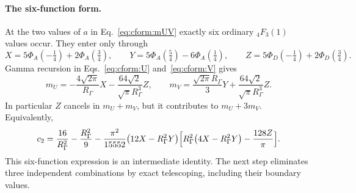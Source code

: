 \documentclass[11pt,a4paper]{article}
\numberwithin{equation}{section}
\begin{document}
\paragraph{The six-function form.} At the two values of $a$ in Eq.~\eqref{eq:cform:mUV} exactly six ordinary
${}_4F_3(1)$ values occur. They enter only through
\begin{equation}
 X=5\Phi_A(-\tfrac14)+2\Phi_A(\tfrac34),\qquad Y=5\Phi_A(\tfrac54)-6\Phi_A(\tfrac14),\qquad
 Z=5\Phi_D(-\tfrac14)+2\Phi_D(\tfrac34).
 \label{eq:cform:XYZ}
\end{equation}
Gamma recursion in Eqs.~\eqref{eq:cform:U} and~\eqref{eq:cform:V} gives
\begin{equation}
 m_U=-\frac{4\sqrt{2\pi}}{R_\Gamma}X-\frac{64\sqrt2}{\sqrt\pi R_\Gamma^3}Z,\qquad
 m_V=\frac{\sqrt{2\pi}R_\Gamma}{3}Y+\frac{64\sqrt2}{\sqrt\pi R_\Gamma^3}Z.
\end{equation}
In particular $Z$ cancels in $m_U+m_V$, but it contributes to $m_U+3m_V$. Equivalently,
\begin{equation}
 c_2=\frac{16}{R_\Gamma^2}-\frac{R_\Gamma^2}{9}-\frac{\pi^2}{15552}\bigl(12X-R_\Gamma^2Y\bigr)
 \Bigl[R_\Gamma^2\bigl(4X-R_\Gamma^2Y\bigr)-\frac{128Z}{\pi}\Bigr].
 \label{eq:cform:sixfunction}
\end{equation}
This six-function expression is an intermediate identity. The next step eliminates three independent combinations by
exact telescoping, including their boundary values.

\end{document}
